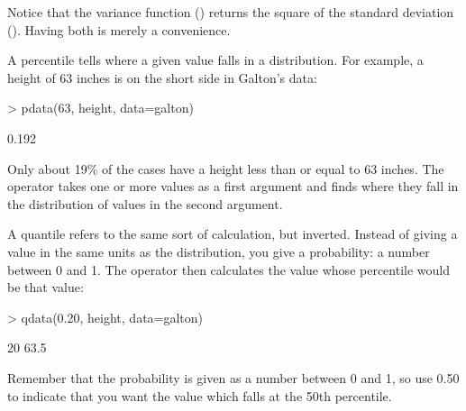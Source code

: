 Notice that the variance function () returns the square
of the standard deviation ().
Having both is merely a convenience.

A percentile tells where a given value falls in a distribution.  For example, a height of 63 inches is on the short side in Galton's data:
\begin{Schunk}
\begin{Sinput}
> pdata(63, height, data=galton)
\end{Sinput}
\begin{Soutput}
[1] 0.192
\end{Soutput}
\end{Schunk}
Only about 19\% of the cases have a height less than or equal to 63 inches.  The  operator takes one or more values as a first argument and finds where they fall in the distribution of values in the second argument.

A quantile refers to the same sort of calculation, but inverted.  Instead of giving a value in the same units as the distribution, you give a probability: a number between 0 and 1.  The  operator then calculates the value whose percentile would be that value:
\begin{Schunk}
\begin{Sinput}
> qdata(0.20, height, data=galton)
\end{Sinput}
\begin{Soutput}
 20%
63.5 
\end{Soutput}
\end{Schunk}
Remember that the probability is given as a number between 0 and 1, so use 0.50 to indicate that you want the value which falls at the 50th percentile.

